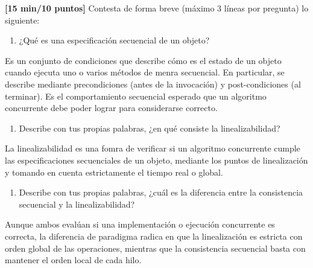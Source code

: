\item[\textbf{1.}] \textbf{[15 min/10 puntos]} \textcolor{dkgreen}{Contesta de forma breve (máximo 3 líneas por pregunta) lo siguiente:}
\begin{enumerate}
    \item \textcolor{dkgreen}{¿Qué es una especificación secuencial de un objeto?}
\end{enumerate}
    Es un conjunto de condiciones que describe cómo es el estado de un objeto cuando ejecuta uno o varios métodos de menra secuencial. En particular, se describe mediante precondiciones (antes de la invocación) y post-condiciones (al terminar). Es el comportamiento secuencial esperado que un algoritmo concurrente debe poder lograr para considerarse correcto.
\begin{enumerate}
    \item \textcolor{dkgreen}{Describe con tus propias palabras, ¿en qué consiste la linealizabilidad?}
\end{enumerate}
La linealizabilidad es una fomra de verificar si un algoritmo concurrente cumple las especificaciones secuenciales de un objeto, mediante los puntos de linealización y tomando en cuenta estrictamente el tiempo real o global.
\begin{enumerate}
    \item \textcolor{dkgreen}{Describe con tus propias palabras, ¿cuál es la diferencia entre la consistencia secuencial y la linealizabilidad?}
\end{enumerate}
Aunque ambos evalúan si una implementación o ejecución concurrente es correcta, la diferencia de paradigma radica en que la linealización es estricta con orden global de las operaciones, mientras que la consistencia secuencial basta con mantener el orden local de cada hilo.